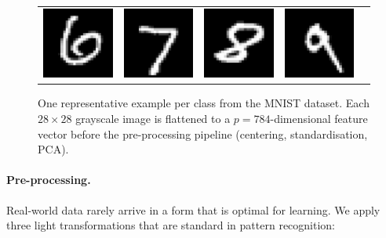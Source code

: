 \documentclass[twocolumn]{article} %
\begin{document}
\begin{figure}[htbp]
\begin{tabular}{ccccc}
    \includegraphics[width=0.18\linewidth]{figures/digits/digits_6.png} & %
    \includegraphics[width=0.18\linewidth]{figures/digits/digits_7.png} & %
    \includegraphics[width=0.18\linewidth]{figures/digits/digits_8.png} & %
    \includegraphics[width=0.18\linewidth]{figures/digits/digits_9.png}   %
  \end{tabular}
  \caption{One representative example per class from the MNIST
           dataset.  Each \(28\times28\) grayscale image is flattened to a
           \(p=784\)-dimensional feature vector before the
           pre-processing pipeline (centering, standardisation, PCA).}
  \label{fig:mnist-examples}
\end{figure}

\paragraph{Pre-processing.}
Real-world data rarely arrive in a form that is optimal for learning.
We apply three light transformations that are standard in pattern
recognition:
\end{document}

